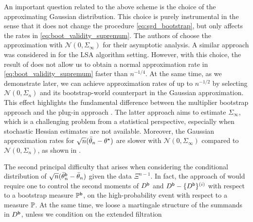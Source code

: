 An important question related to the above scheme is the choice of the approximating Gaussian distribution. This choice is purely instrumental in the sense that it does not change the procedure \eqref{eq:sgd_bootstrap}, but only affects the rates in \eqref{eq:boot_validity_supremum}. The authors of \cite{JMLR:v19:17-370} choose the approximation with $\mathcal N(0,  \Sigma_{\infty})$ for their asymptotic analysis. A similar approach was considered in \cite[Theorem 3]{samsonov2024gaussian} for the LSA algorithm setting. However, with this choice, the result of  does not allow us to obtain a normal approximation rate in \eqref{eq:boot_validity_supremum} faster than $n^{-1/4}$. At the same time, as we demonstrate later, we can achieve approximation rates of up to $n^{-1/2}$ by selecting $\mathcal N(0,  \Sigma_{n})$ and its bootstrap-world counterpart in the Gaussian approximation. This effect highlights the fundamental difference between the multiplier bootstrap approach and the plug-in approach \cite{chen2020aos}. The latter approach aims to estimate $\Sigma_{\infty}$, which is a challenging problem from a statistical perspective, especially when stochastic Hessian estimates are not available. Moreover, the Gaussian approximation rates for $\sqrt n  (\bar{\theta}_{n} - \theta^\star)$ are slower with $\mathcal{N}(0,\Sigma_{\infty})$ compared to $\mathcal{N}(0,\Sigma_{n})$, as shown in .
\par 
The second principal difficulty that arises when considering the conditional distribution of $\sqrt n  (\bar{\theta}_{n}^{\mathsf{b}} - \bar{\theta}_n)$ given the data $\Xi^{n-1}$. In fact, the approach of \cite{shao2022berry} would require one to control the second moments of $D^{\mathsf{b}}$ and $D^{\mathsf{b}} - \{D^{\mathsf{b}}\}^{(i)}$ with respect to a bootstrap measure $\mathbb{P}^{\mathsf{b}}$, on the high-probability event with respect to a measure $\mathbb{P}$. At the same time, we loose a martingale structure of the summands in $D^{\mathsf{b}}$, unless we condition on the extended filtration 
